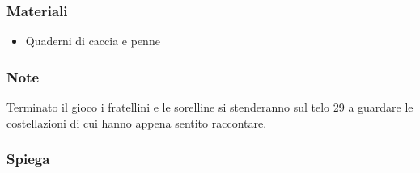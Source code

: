 \documentclass[../main.tex]{subfiles}
\begin{document}
        \subsubsection{Materiali}
        \begin{itemize}
            \item Quaderni di caccia e penne
        \end{itemize}
        \subsubsection{Note}
        Terminato il gioco i fratellini e le sorelline si stenderanno sul telo 29 a guardare le costellazioni di cui hanno appena sentito raccontare.
        \subsubsection{Spiega}
   
\end{document}
